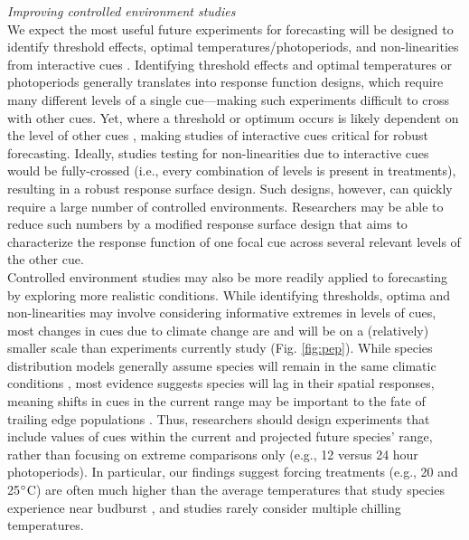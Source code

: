 \documentclass[11pt,letter]{article}
\begin{document}
\emph{Improving controlled environment studies}\\
We expect the most useful future experiments for forecasting will be designed to identify threshold effects, optimal temperatures/photoperiods, and non-linearities from interactive cues \citep{Caffarra:2011qf}. Identifying threshold effects and optimal temperatures or photoperiods generally translates into response function designs, which require many different levels of a single cue---making such experiments difficult to cross with other cues. Yet, where a threshold or optimum occurs is likely dependent on the level of other cues \citep{stearns1958,flynn2018}, making studies of interactive cues critical for robust forecasting. Ideally, studies testing for non-linearities due to interactive cues would be fully-crossed (i.e., every combination of levels is present in treatments), resulting in a robust response surface design. Such designs, however, can quickly require a large number of controlled environments. Researchers may be able to reduce such numbers by a modified response surface design that aims to characterize the response function of one focal cue across several relevant levels of the other cue. \\ %

Controlled environment studies may also be more readily applied to forecasting by exploring more realistic conditions. While identifying thresholds, optima and non-linearities may involve considering informative extremes in levels of cues, most changes in cues due to climate change are and will be on a (relatively) smaller scale than experiments currently study (Fig. \ref{fig:pep}). While species distribution models generally assume species will remain in the same climatic conditions \citep{elith2009species}, most evidence suggests species will lag in their spatial responses, meaning shifts in cues in the current range may be important to the fate of trailing edge populations \citep{bertrand2011changes,lenoir2015climate}. Thus, researchers should design experiments that include values of cues within the current and projected future species' range, rather than focusing on extreme comparisons only (e.g., 12 versus 24 hour photoperiods). In particular, our findings suggest forcing treatments (e.g., 20 and 25$\degree$C) are often much higher than the average temperatures that study species experience near budburst \citep{fu2015,gusewell2017}, and studies rarely consider multiple chilling temperatures. \\ %
\end{document}
